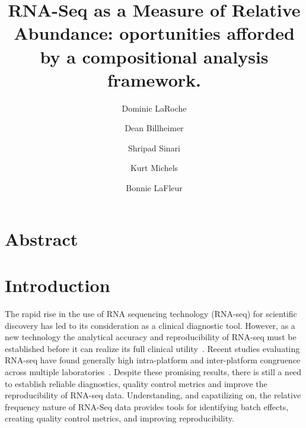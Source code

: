 \documentclass{article}\usepackage[]{graphicx}\usepackage[]{color}
\title{RNA-Seq as a Measure of Relative Abundance: oportunities afforded by a compositional analysis framework.}
\author{Dominic LaRoche \and Dean Billheimer \and Shripad Sinari \and Kurt Michels \and  Bonnie LaFleur}
\begin{document}
\maketitle

\doublespacing
\section{Abstract}


\section{Introduction}

The rapid rise in the use of RNA sequencing technology (RNA-seq) for scientific discovery has led to its consideration as a clinical diagnostic tool.  However, as a new technology the analytical accuracy and reproducibility of RNA-seq must be established before it can realize its full clinical utility~\cite{SEQC/MAQC-IIIConsortium2014,VanKeuren-Jensen2014}. Recent studies evaluating RNA-seq have found generally high intra-platform and inter-platform congruence across multiple laboratories~\cite{Li2013, tHoen2013, SEQC/MAQC-IIIConsortium2014}.  Despite these promising results, there is still a need to establish reliable diagnostics, quality control metrics and improve the reproducibility of RNA-seq data.  Understanding, and capatilizing on, the relative frequency nature of RNA-Seq data provides tools for identifying batch effects, creating quality control metrics, and improving reproducibility.\\

\end{document}
